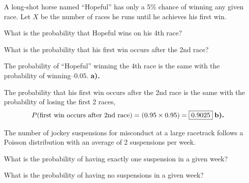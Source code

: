 \documentclass[a4paper, 10pt]{article}
\begin{document}
\begin{problem}
A long-shot horse named ``Hopeful'' has only a 5\% chance of winning any given race.
Let \( X \) be the number of races he runs until he achieves his first win.
\begin{subproblems_alpha}
	\item What is the probability that Hopeful wins on his 4th race?
	\item What is the probability that his first win occurs after the 2nd race?
\end{subproblems_alpha}
\end{problem}

\begin{tosubmit}
	\par The probability of ``Hopeful'' winning the 4th race is the same with the probability of winning--\(\boxed{0.05}\). \textbf{a).}
	\par The probability that his first win occurs after the 2nd race is
	the same with the probability of losing the first 2 races,
	\[
		P(\text{first win occurs after 2nd race}) = \left(0.95 \times 0.95\right) = \boxed{0.9025} \; \textbf{b).}  \\
	\]
\end{tosubmit}

\pagebreak

\begin{problem}
The number of jockey suspensions for misconduct at a large racetrack
follows a Poisson distribution with an average of 2 suspensions per week.
\begin{subproblems_alpha}
	\item What is the probability of having exactly one suspension in a given week?
	\item What is the probability of having no suspensions in a given week?
\end{subproblems_alpha}
\end{problem}
\end{document}
